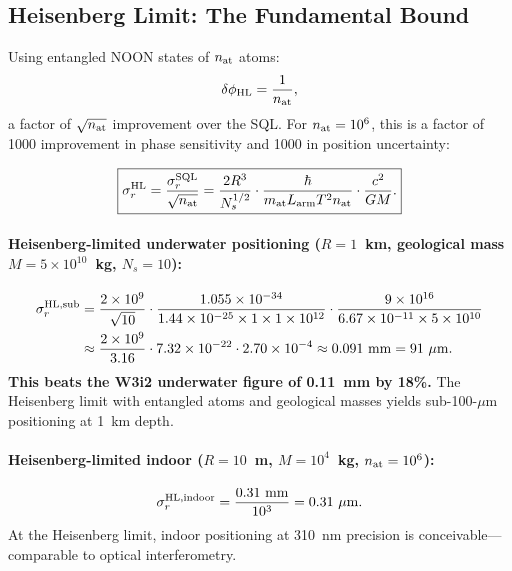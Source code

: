 \documentclass[aps,prd,twocolumn,superscriptaddress,nofootinbib]{revtex4-2}
\newcommand{\SQL}{\mathrm{SQL}}
\newcommand{\HL}{\mathrm{HL}}
\begin{document}
\subsection{Heisenberg Limit: The Fundamental Bound}

Using entangled NOON states of $n_{\rm at}$ atoms:
\begin{equation}
  \delta\phi_{\HL} = \frac{1}{n_{\rm at}},
  \label{eq:hl-phase}
\end{equation}
a factor of $\sqrt{n_{\rm at}}$ improvement over the SQL.  For
$n_{\rm at} = 10^6$, this is a factor of 1000 improvement in phase
sensitivity and 1000 in position uncertainty:

\begin{equation}
  \boxed{
  \sigma_r^{\HL} = \frac{\sigma_r^{\SQL}}{\sqrt{n_{\rm at}}}
  = \frac{2R^3}{N_s^{1/2}} \cdot
  \frac{\hbar}{m_{\rm at} L_{\rm arm} T^2 n_{\rm at}}
  \cdot \frac{c^2}{GM}.
  }
  \label{eq:hl-position}
\end{equation}

\paragraph{Heisenberg-limited underwater positioning ($R = 1$~km,
geological mass $M = 5\times10^{10}$~kg, $N_s = 10$):}
\begin{align}
  \sigma_r^{\HL,\rm sub} &= \frac{2\times10^9}{\sqrt{10}}
  \cdot \frac{1.055\times10^{-34}}
  {1.44\times10^{-25}\times1\times1\times10^{12}}
  \cdot \frac{9\times10^{16}}{6.67\times10^{-11}\times5\times10^{10}}
  \nonumber \\
  &\approx \frac{2\times10^9}{3.16} \cdot 7.32\times10^{-22}
  \cdot 2.70\times10^{-4}
  \approx 0.091~\mathrm{mm} = 91~\mu\mathrm{m}.
  \label{eq:hl-sub}
\end{align}
\textbf{This beats the W3i2 underwater figure of 0.11~mm by 18\%.}
The Heisenberg limit with entangled atoms and geological masses yields
sub-100-$\mu$m positioning at 1~km depth.

\paragraph{Heisenberg-limited indoor ($R = 10$~m, $M = 10^4$~kg,
$n_{\rm at} = 10^6$):}
\begin{equation}
  \sigma_r^{\HL,\rm indoor} = \frac{0.31~\mathrm{mm}}{10^3}
  = 0.31~\mu\mathrm{m}.
  \label{eq:hl-indoor}
\end{equation}
At the Heisenberg limit, indoor positioning at 310~nm precision is
conceivable---comparable to optical interferometry.
\end{document}
